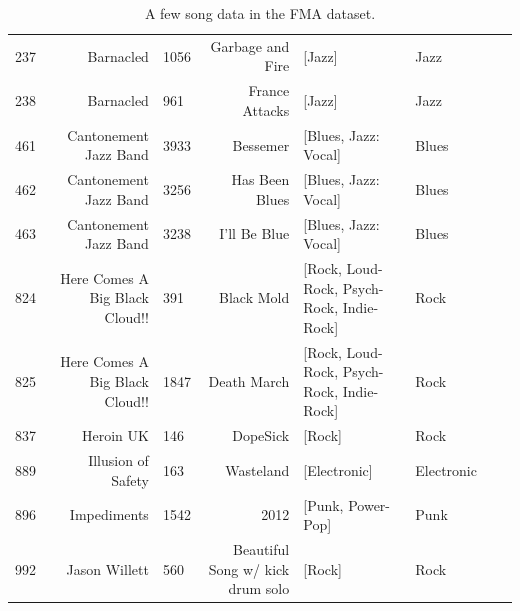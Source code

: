 \documentclass{article}
\begin{document}
\begin{table}
{\begin{tabular}{lrlrllll}
     237 &                                          Barnacled &        1056 &                    Garbage and Fire &                                             [Jazz] &                 Jazz  \\
     238 &                                          Barnacled &         961 &                                     France Attacks &                                             [Jazz] &                 Jazz  \\
     461 &                              Cantonement Jazz Band &        3933 &                                           Bessemer &                               [Blues, Jazz: Vocal] &                Blues  \\
     462 &                              Cantonement Jazz Band &        3256 &                                     Has Been Blues &                               [Blues, Jazz: Vocal] &                Blues  \\
     463 &                              Cantonement Jazz Band &        3238 &                                       I'll Be Blue &                               [Blues, Jazz: Vocal] &                Blues  \\
    824 &                     Here Comes A Big Black Cloud!! &         391 &                                         Black Mold &          [Rock, Loud-Rock, Psych-Rock, Indie-Rock] &                 Rock  \\
     825 &                     Here Comes A Big Black Cloud!! &        1847 &                                        Death March &          [Rock, Loud-Rock, Psych-Rock, Indie-Rock] &                 Rock  \\
    837 &                                          Heroin UK &         146 &                                           DopeSick &                                             [Rock] &                 Rock \\
     889 &                                 Illusion of Safety &         163 &                                          Wasteland &                                       [Electronic] &           Electronic  \\
     896 &                                        Impediments &        1542 &                                               2012 &                                  [Punk, Power-Pop] &                 Punk  \\
          992 &                                      Jason Willett &         560 &                   Beautiful Song w/ kick drum solo &                                             [Rock] &                 Rock  \\
\bottomrule
\end{tabular}
\caption{A few song data in the FMA dataset.}
\label{tab1}
}
\end{table}
\end{document}
